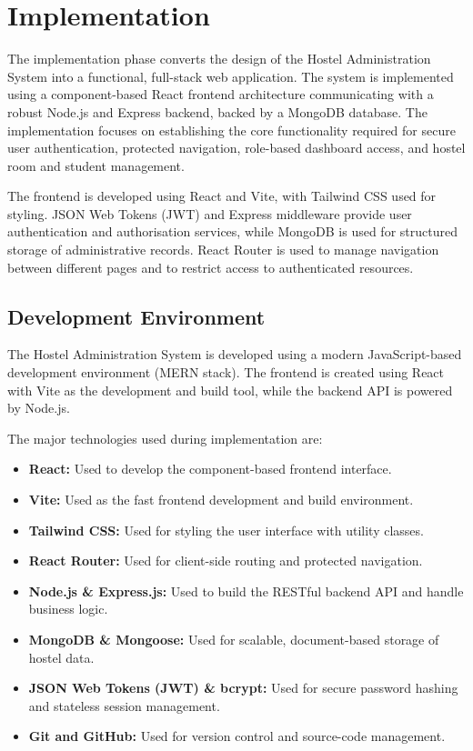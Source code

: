 \chapter{Implementation}

The implementation phase converts the design of the Hostel Administration System into a functional, full-stack web application. The system is implemented using a component-based React frontend architecture communicating with a robust Node.js and Express backend, backed by a MongoDB database. The implementation focuses on establishing the core functionality required for secure user authentication, protected navigation, role-based dashboard access, and hostel room and student management.

The frontend is developed using React and Vite, with Tailwind CSS used for styling. JSON Web Tokens (JWT) and Express middleware provide user authentication and authorisation services, while MongoDB is used for structured storage of administrative records. React Router is used to manage navigation between different pages and to restrict access to authenticated resources.

\section{Development Environment}

The Hostel Administration System is developed using a modern JavaScript-based development environment (MERN stack). The frontend is created using React with Vite as the development and build tool, while the backend API is powered by Node.js.

The major technologies used during implementation are:

\begin{itemize}
    \item \textbf{React:} Used to develop the component-based frontend interface.
    \item \textbf{Vite:} Used as the fast frontend development and build environment.
    \item \textbf{Tailwind CSS:} Used for styling the user interface with utility classes.
    \item \textbf{React Router:} Used for client-side routing and protected navigation.
    \item \textbf{Node.js \& Express.js:} Used to build the RESTful backend API and handle business logic.
    \item \textbf{MongoDB \& Mongoose:} Used for scalable, document-based storage of hostel data.
    \item \textbf{JSON Web Tokens (JWT) \& bcrypt:} Used for secure password hashing and stateless session management.
    \item \textbf{Git and GitHub:} Used for version control and source-code management.
\end{itemize}

